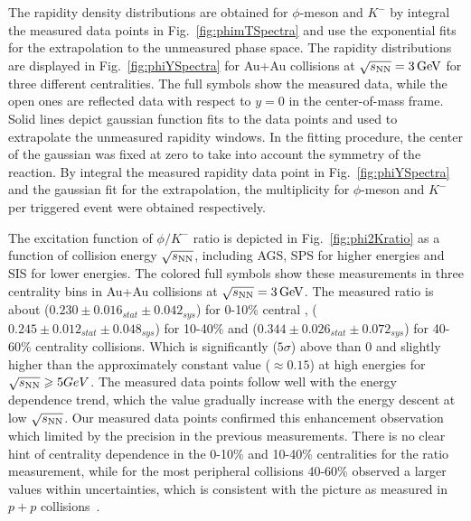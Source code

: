 \documentclass[%
 reprint,	
showpacs,
 amsmath,amssymb,
 aps,
 prc,
]{revtex4-1}
\begin{document}
The rapidity density distributions are obtained for $\phi$-meson and $K^-$ by integral the measured data points in Fig.~\ref{fig:phimTSpectra} and use the exponential fits for the extrapolation to the unmeasured phase space. The rapidity distributions are displayed in Fig.~\ref{fig:phiYSpectra} for Au+Au collisions at ${\sqrt{s_{\rm NN}} = \rm{3\,GeV}}$ for three different centralities. The full symbols show the measured data, while the open ones are reflected data with respect to $y=0$ in the center-of-mass frame. Solid lines depict gaussian function fits to the data points and used to extrapolate the unmeasured rapidity windows. In the fitting procedure, the center of the gaussian was fixed at zero to take into account the symmetry of the reaction. By integral the measured rapidity data point in Fig.~\ref{fig:phiYSpectra} and the gaussian fit for the extrapolation, the multiplicity for $\phi$-meson and $K^-$ per triggered event were obtained respectively.



The excitation function of $\phi/K^-$ ratio is depicted in Fig.~\ref{fig:phi2Kratio} as a function of collision energy $\sqrt{s_{\rm NN}}$, including AGS, SPS for higher energies and SIS for lower energies. The colored full symbols show these measurements in three centrality bins in Au+Au collisions at ${\sqrt{s_{\rm NN}} = \rm{3\,GeV}}$. The measured ratio is about ($0.230\pm0.016_{stat}\pm0.042_{sys}$) for 0-10\% central , ($0.245\pm0.012_{stat}\pm0.048_{sys}$) for 10-40\% and ($0.344\pm0.026_{stat}\pm0.072_{sys}$) for 40-60\% centrality collisions. Which is significantly ($5\sigma$) above than 0 and slightly higher than the approximately constant value ($\approx0.15$) at high energies for $\sqrt{s_{\rm NN}}\geqslant 5 GeV$. The measured data points follow well with the energy dependence trend, which the value gradually increase with the energy descent at low $\sqrt{s_{\rm NN}}$. Our measured data points confirmed this enhancement observation which limited by the precision in the previous measurements. There is no clear hint of centrality dependence in the 0-10\% and 10-40\% centralities for the ratio measurement, while for the most peripheral collisions 40-60\% observed a larger values within uncertainties, which is consistent with the picture as measured in $p+p$ collisions~\cite{PhysRevC.77.015204}.
\end{document}
